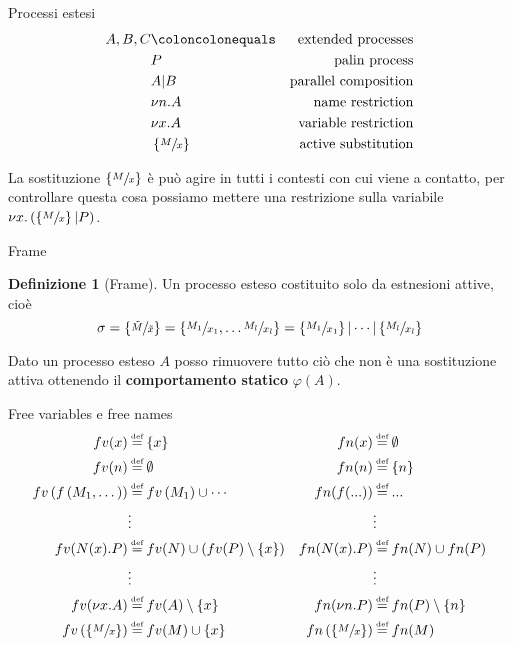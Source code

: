\documentclass{beamer}
\newcounter{counter1}
\theoremstyle{plain}
\theoremstyle{definition}
\newtheorem{mydef}[counter1]{Definizione}
\theoremstyle{remark}
\newcommand{\set}[1]{\left\{#1\right\}}
\newcommand{\pa}[1]{\left(#1\right)}
\newcommand*{\eqdef}{\ensuremath{\overset{\mathclap{\text{\tiny def}}}{=}}}
\begin{document}
\begin{frame}{Processi estesi}
  \begin{align*}
    A,B,C & \coloncolonequals & \text{extended processes} \\
          & P & \text{palin process} \\
          & A | B & \text{parallel composition} \\
          & \nu n.A & \text{name restriction} \\
          & \nu x.A & \text{variable restriction} \\
          & \left\{ \sfrac{M}{x} \right\} & \text{active substitution}
  \end{align*}
  
  La sostituzione $\left\{ \sfrac{M}{x} \right\}$ \`e pu\`o agire in
  tutti i contesti con cui viene a contatto, per controllare questa cosa
  possiamo mettere una restrizione sulla variabile $\nu x.\left( \left\{
      \sfrac{M}{x} \right\} | P\right)$.
\end{frame}

\begin{frame}{Frame}
  \begin{mydef}[Frame]
    Un processo esteso costituito solo da estnesioni attive, cio\`e
    \[ \sigma = \set{ \sfrac{\tilde M}{\tilde x}} = \set{
        \sfrac{M_1}{x_1}, \dots \sfrac{M_l}{x_l}} = \set{
        \sfrac{M_1}{x_1}}| \cdots | \set{\sfrac{M_l}{x_l}}\]
  \end{mydef}
  \vfill

  Dato un processo esteso $A$ posso rimuovere tutto ci\`o che non \`e
  una sostituzione attiva ottenendo il \textbf{comportamento statico}
  $\varphi(A)$.
\end{frame}

\begin{frame}{Free variables e free names}
  \begin{align*}
    fv(x) & \eqdef \set{x} & fn(x) & \eqdef \emptyset \\
    fv(n) & \eqdef \emptyset &  fn(n) & \eqdef \set{n} \\
    fv\pa{f\pa{ M_1, \dots }} & \eqdef fv\pa{M_1} \cup \cdots  & fn(f(...)) & \eqdef ... \\
          & \vdots & &\vdots  \\
    fv(N(x).P) & \eqdef fv(N) \cup \pa{fv(P) \setminus \set{x}} &   fn(N(x).P) & \eqdef fn(N) \cup fn(P) \\
          & \vdots & & \vdots \\
    fv(\nu x.A) & \eqdef fv(A) \setminus \set{x} &   fn(\nu n.P) & \eqdef fn(P)\setminus \set{n} \\
    fv\pa{ \set{ \sfrac{M}{x} } } & \eqdef fv(M) \cup \set{x} & fn\pa{ \set{ \sfrac{M}{x} } } & \eqdef fn(M) \\
  \end{align*}
\end{frame}
\end{document}
